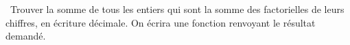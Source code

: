 \question\ Trouver la somme de tous les entiers qui sont la somme des factorielles de leurs chiffres, en écriture décimale. On écrira une fonction  renvoyant le résultat demandé.
